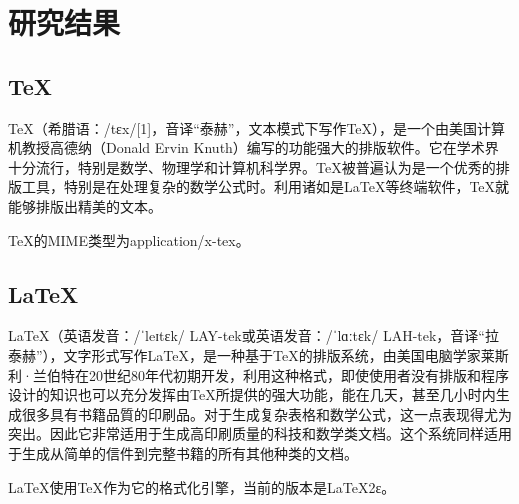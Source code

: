 \chapter{研究结果}

\section{\TeX}
\TeX （希腊语：/tɛx/[1]，音译“泰赫”，文本模式下写作TeX），是一个由美国计算机教授高德纳（Donald Ervin Knuth）编写的功能强大的排版软件。它在学术界十分流行，特别是数学、物理学和计算机科学界。\TeX 被普遍认为是一个优秀的排版工具，特别是在处理复杂的数学公式时。利用诸如是\LaTeX 等终端软件，\TeX 就能够排版出精美的文本。

TeX的MIME类型为application/x-tex。

\section{\LaTeX}
\LaTeX（英语发音：/ˈleɪtɛk/ LAY-tek或英语发音：/ˈlɑːtɛk/ LAH-tek，音译“拉泰赫”），文字形式写作\LaTeX，是一种基于\TeX 的排版系统，由美国电脑学家莱斯利·兰伯特在20世纪80年代初期开发，利用这种格式，即使使用者没有排版和程序设计的知识也可以充分发挥由\TeX 所提供的强大功能，能在几天，甚至几小时内生成很多具有书籍品質的印刷品。对于生成复杂表格和数学公式，这一点表现得尤为突出。因此它非常适用于生成高印刷质量的科技和数学类文档。这个系统同样适用于生成从简单的信件到完整书籍的所有其他种类的文档。

\LaTeX 使用\TeX 作为它的格式化引擎，当前的版本是LaTeX2ε。

